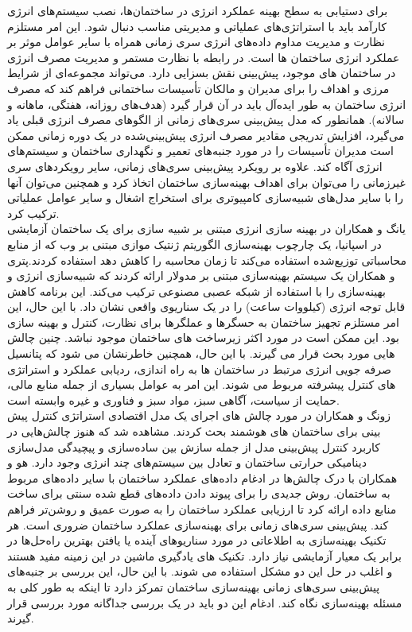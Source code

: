 برای دستیابی به سطح بهینه عملکرد انرژی در ساختمان‌ها، نصب سیستم‌های انرژی کارآمد باید با استراتژی‌های عملیاتی و مدیریتی مناسب دنبال شود. 
این امر مستلزم نظارت و مدیریت مداوم داده‌های انرژی سری زمانی همراه با سایر عوامل موثر بر عملکرد انرژی ساختمان ها است. 
در رابطه با نظارت مستمر و مدیریت مصرف انرژی در ساختمان های موجود، پیش‌بینی نقش بسزایی دارد. می‌تواند مجموعه‌ای از شرایط مرزی و اهداف را برای مدیران و 
مالکان تأسیسات ساختمانی فراهم کند که مصرف انرژی ساختمان به طور ایده‌آل باید در آن قرار گیرد (هدف‌های روزانه، هفتگی، ماهانه و سالانه). 
همانطور که مدل پیش‌بینی سری‌های زمانی از الگوهای مصرف انرژی قبلی یاد می‌گیرد، افزایش تدریجی مقادیر مصرف انرژی پیش‌بینی‌شده
 در یک دوره زمانی ممکن است مدیران تأسیسات را در مورد جنبه‌های تعمیر و نگهداری ساختمان و سیستم‌های انرژی آگاه کند. 
علاوه بر رویکرد پیش‌بینی سری‌های زمانی، سایر رویکردهای سری غیرزمانی را می‌توان برای اهداف بهینه‌سازی ساختمان اتخاذ کرد
 و همچنین می‌توان آنها را با سایر مدل‌های شبیه‌سازی کامپیوتری برای استخراج اشغال و
  سایر عوامل عملیاتی ترکیب کرد.
  \\
   یانگ و همکاران در بهینه سازی انرژی مبتنی بر شبیه سازی برای یک ساختمان آزمایشی در 
  اسپانیا، یک چارچوب بهینه‌سازی الگوریتم ژنتیک موازی
  مبتنی بر وب  که از منابع محاسباتی توزیع‌شده استفاده می‌کند تا زمان محاسبه
   را کاهش دهد استفاده کردند.پتری  و همکاران یک سیستم بهینه‌سازی مبتنی بر مدولار ارائه کردند
    که شبیه‌سازی انرژی و بهینه‌سازی را با استفاده از شبکه عصبی مصنوعی ترکیب می‌کند.
    این برنامه کاهش قابل توجه انرژی (کیلووات ساعت) را در یک سناریوی واقعی نشان داد.
    با این حال، این امر مستلزم تجهیز ساختمان به حسگرها و عملگرها برای نظارت، کنترل
    و بهینه سازی بود. این ممکن است در مورد اکثر زیرساخت های ساختمان موجود نباشد.
    چنین چالش هایی مورد بحث قرار می گیرند. با این حال، همچنین خاطرنشان می شود
    که پتانسیل صرفه جویی انرژی مرتبط در ساختمان ها به راه اندازی، ردیابی عملکرد
    و استراتژی های کنترل پیشرفته مربوط می شوند. این امر به عوامل بسیاری از جمله منابع مالی،
    حمایت از سیاست، آگاهی سبز، مواد سبز و فناوری و غیره وابسته است.
    \\
    زونگ و همکاران در مورد چالش های اجرای یک مدل اقتصادی 
    استراتژی کنترل پیش بینی  برای ساختمان های هوشمند بحث کردند. مشاهده شد که هنوز چالش‌هایی
     در کاربرد کنترل پیش‌بینی مدل از جمله سازش بین ساده‌سازی و پیچیدگی مدل‌سازی 
    دینامیکی حرارتی ساختمان و تعادل بین سیستم‌های چند انرژی وجود دارد.
     هو و همکاران با درک چالش‌ها در ادغام داده‌های عملکرد ساختمان
     با سایر داده‌های مربوط به ساختمان. روش جدیدی را برای پیوند
     دادن داده‌های قطع شده سنتی برای ساخت منابع داده ارائه کرد تا 
    ارزیابی عملکرد ساختمان را به صورت عمیق و روشن‌تر فراهم کند. 
پیش‌بینی سری‌های زمانی برای بهینه‌سازی عملکرد ساختمان ضروری است. هر تکنیک بهینه‌سازی به
 اطلاعاتی در مورد سناریوهای آینده یا یافتن بهترین راه‌حل‌ها در برابر یک معیار
  آزمایشی نیاز دارد. تکنیک های یادگیری ماشین در این زمینه مفید هستند و اغلب در حل این دو مشکل استفاده می شوند. 
با این حال، این بررسی بر جنبه‌های پیش‌بینی سری‌های زمانی بهینه‌سازی ساختمان تمرکز دارد تا اینکه به طور کلی به مسئله بهینه‌سازی نگاه کند. ادغام این دو باید در یک بررسی جداگانه مورد بررسی قرار گیرند.




